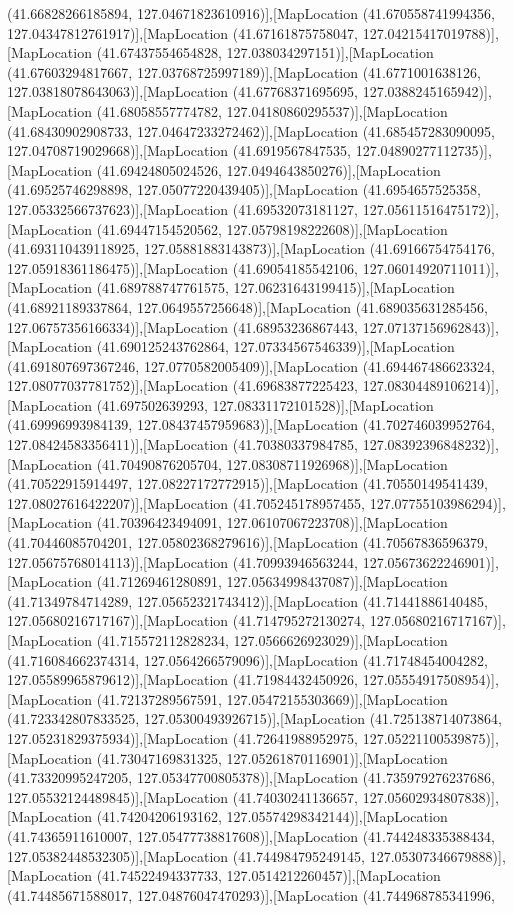 (41.66828266185894, 127.04671823610916)],[MapLocation (41.670558741994356, 127.04347812761917)],[MapLocation (41.67161875758047, 127.04215417019788)],[MapLocation (41.67437554654828, 127.038034297151)],[MapLocation (41.67603294817667, 127.03768725997189)],[MapLocation (41.6771001638126, 127.03818078643063)],[MapLocation (41.67768371695695, 127.0388245165942)],[MapLocation (41.68058557774782, 127.04180860295537)],[MapLocation (41.68430902908733, 127.04647233272462)],[MapLocation (41.685457283090095, 127.04708719029668)],[MapLocation (41.6919567847535, 127.04890277112735)],[MapLocation (41.69424805024526, 127.0494643850276)],[MapLocation (41.69525746298898, 127.05077220439405)],[MapLocation (41.6954657525358, 127.05332566737623)],[MapLocation (41.69532073181127, 127.05611516475172)],[MapLocation (41.69447154520562, 127.05798198222608)],[MapLocation (41.693110439118925, 127.05881883143873)],[MapLocation (41.69166754754176, 127.05918361186475)],[MapLocation (41.69054185542106, 127.06014920711011)],[MapLocation (41.689788747761575, 127.06231643199415)],[MapLocation (41.68921189337864, 127.0649557256648)],[MapLocation (41.689035631285456, 127.06757356166334)],[MapLocation (41.68953236867443, 127.07137156962843)],[MapLocation (41.690125243762864, 127.07334567546339)],[MapLocation (41.691807697367246, 127.0770582005409)],[MapLocation (41.694467486623324, 127.08077037781752)],[MapLocation (41.69683877225423, 127.08304489106214)],[MapLocation (41.697502639293, 127.08331172101528)],[MapLocation (41.69996993984139, 127.08437457959683)],[MapLocation (41.702746039952764, 127.08424583356411)],[MapLocation (41.70380337984785, 127.08392396848232)],[MapLocation (41.70490876205704, 127.08308711926968)],[MapLocation (41.70522915914497, 127.08227172772915)],[MapLocation (41.70550149541439, 127.08027616422207)],[MapLocation (41.705245178957455, 127.07755103986294)],[MapLocation (41.70396423494091, 127.06107067223708)],[MapLocation (41.70446085704201, 127.05802368279616)],[MapLocation (41.70567836596379, 127.05675768014113)],[MapLocation (41.70993946563244, 127.05673622246901)],[MapLocation (41.71269461280891, 127.05634998437087)],[MapLocation (41.71349784714289, 127.05652321743412)],[MapLocation (41.71441886140485, 127.05680216717167)],[MapLocation (41.714795272130274, 127.05680216717167)],[MapLocation (41.715572112828234, 127.0566626923029)],[MapLocation (41.716084662374314, 127.0564266579096)],[MapLocation (41.71748454004282, 127.05589965879612)],[MapLocation (41.71984432450926, 127.05554917508954)],[MapLocation (41.72137289567591, 127.05472155303669)],[MapLocation (41.723342807833525, 127.05300493926715)],[MapLocation (41.725138714073864, 127.05231829375934)],[MapLocation (41.72641988952975, 127.05221100539875)],[MapLocation (41.73047169831325, 127.05261870116901)],[MapLocation (41.73320995247205, 127.05347700805378)],[MapLocation (41.735979276237686, 127.05532124489845)],[MapLocation (41.74030241136657, 127.05602934807838)],[MapLocation (41.74204206193162, 127.05574298342144)],[MapLocation (41.74365911610007, 127.05477738817608)],[MapLocation (41.744248335388434, 127.05382448532305)],[MapLocation (41.744984795249145, 127.05307346679888)],[MapLocation (41.74522494337733, 127.0514212260457)],[MapLocation (41.74485671588017, 127.04876047470293)],[MapLocation (41.744968785341996, 